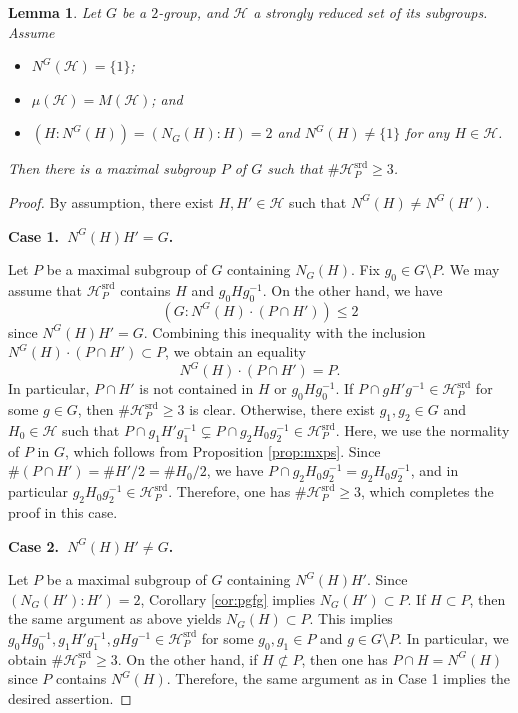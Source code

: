 \documentclass[12pt]{amsart}
\theoremstyle{plain}
\newtheorem{lem}[thm]{Lemma}
\theoremstyle{definition}
\numberwithin{thm}{section}
\numberwithin{equation}{section}
\newcommand{\cH}{\mathcal{H}}
\DeclareMathOperator{\srd}{srd}
\begin{document}
\begin{lem}\label{lem:mxgt}
Let $G$ be a $2$-group, and $\cH$ a strongly reduced set of its subgroups. Assume
\begin{itemize}
\item $N^{G}(\cH)=\{1\}$; 
\item $\mu(\cH)=M(\cH)$; and
\item $(H:N^{G}(H))=(N_{G}(H):H)=2$ and $N^{G}(H)\neq \{1\}$ for any $H\in \cH$. 
\end{itemize}
Then there is a maximal subgroup $P$ of $G$ such that $\#\cH_{P}^{\srd}\geq 3$. 
\end{lem}

\begin{proof}
By assumption, there exist $H,H'\in \cH$ such that $N^{G}(H)\neq N^{G}(H')$. 

\textbf{Case 1.~$N^{G}(H)H'=G$. }

Let $P$ be a maximal subgroup of $G$ containing $N_{G}(H)$. Fix $g_{0}\in G \setminus P$. We may assume that $\cH_{P}^{\srd}$ contains $H$ and $g_{0}Hg_{0}^{-1}$. On the other hand, we have 
\begin{equation*}
    (G:N^{G}(H)\cdot (P\cap H'))\leq 2
\end{equation*}
since $N^{G}(H)H'=G$. Combining this inequality with the inclusion $N^{G}(H)\cdot (P\cap H')\subset P$, we obtain an equality
\begin{equation*}
N^{G}(H)\cdot (P\cap H')=P. 
\end{equation*}
In particular, $P\cap H'$ is not contained in $H$ or $g_{0}Hg_{0}^{-1}$. If $P\cap gH'g^{-1}\in \cH_{P}^{\srd}$ for some $g\in G$, then $\#\cH_{P}^{\srd}\geq 3$ is clear. Otherwise, there exist $g_{1},g_{2}\in G$ and $H_{0}\in \cH$ such that $P\cap g_{1}H'g_{1}^{-1}\subsetneq P\cap g_{2}H_{0}g_{2}^{-1}\in \cH_{P}^{\srd}$. Here, we use the normality of $P$ in $G$, which follows from Proposition \ref{prop:mxps}. Since $\#(P\cap H')=\#H'/2=\#H_{0}/2$, we have $P\cap g_{2}H_{0}g_{2}^{-1}=g_{2}H_{0}g_{2}^{-1}$, and in particular $g_{2}H_{0}g_{2}^{-1}\in \cH_{P}^{\srd}$. Therefore, one has $\#\cH_{P}^{\srd}\geq 3$, which completes the proof in this case. 

\textbf{Case 2.~$N^{G}(H)H'\neq G$. }

Let $P$ be a maximal subgroup of $G$ containing $N^{G}(H)H'$. Since $(N_{G}(H'):H')=2$, Corollary \ref{cor:pgfg} implies $N_{G}(H')\subset P$. If $H\subset P$, then the same argument as above yields $N_{G}(H)\subset P$. This implies $g_{0}Hg_{0}^{-1},g_{1}H'g_{1}^{-1},gHg^{-1}\in \cH_{P}^{\srd}$ for some $g_{0},g_{1}\in P$ and $g\in G\setminus P$. In particular, we obtain $\#\cH_{P}^{\srd}\geq 3$. On the other hand, if $H\not\subset P$, then one has $P\cap H=N^{G}(H)$ since $P$ contains $N^{G}(H)$. Therefore, the same argument as in Case 1 implies the desired assertion. 
\end{proof}
\end{document}
